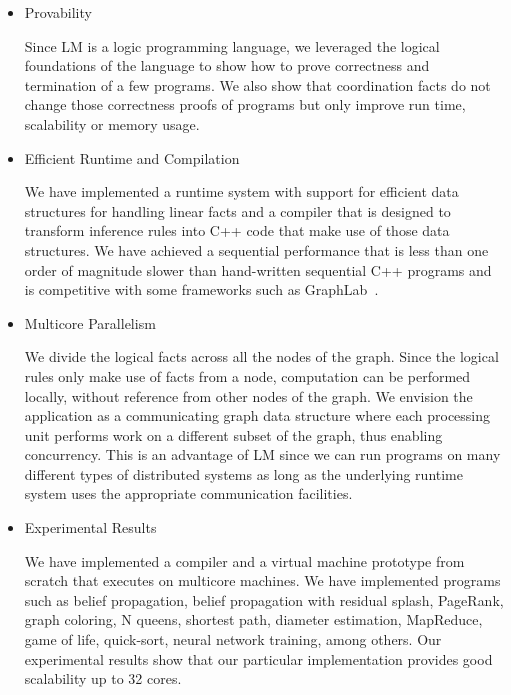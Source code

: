 \begin{itemize}
   \item Provability
   
   Since LM is a logic programming language, we leveraged the logical
   foundations of the language to show how to prove correctness and termination of a few
   programs. We also show that coordination facts do not change those
   correctness proofs of programs but only improve run time, scalability or
   memory usage.


   \item Efficient Runtime and Compilation

   We have implemented a runtime system with support for efficient data
   structures for handling linear facts and a compiler that is designed to
   transform inference rules into C++ code that make use of those data
   structures. We have achieved a sequential performance that is less than one
   order of magnitude slower than hand-written sequential C++ programs and is
   competitive with some frameworks such as GraphLab~\cite{GraphLab2010}.

   \item Multicore Parallelism
   
   We divide the logical facts across all the nodes of the graph. Since the
   logical rules only make use of facts from a node, computation can be
   performed locally, without reference from other nodes of the graph.
   We envision the application as a communicating graph data structure where
   each processing unit performs work on a different subset of the graph, thus
   enabling concurrency. This is an advantage of LM since we can run programs on
   many different types of distributed systems as long as the underlying runtime
   system uses the appropriate communication facilities.

   \item Experimental Results

   We have implemented a compiler and a virtual machine prototype from
   scratch that executes on multicore machines.  We have implemented programs
   such as belief propagation, belief propagation with residual splash,
   PageRank, graph coloring, N queens, shortest path, diameter estimation,
   MapReduce, game of life, quick-sort, neural network training, among others.
   Our experimental results show that our particular implementation provides
   good scalability up to 32 cores.
   
\end{itemize}
